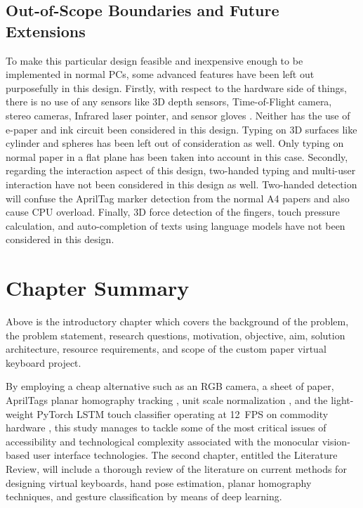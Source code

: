 \subsection{Out-of-Scope Boundaries and Future Extensions}
\label{subsec:out_scope_boundaries}
To make this particular design feasible and inexpensive enough to be implemented in normal PCs, some advanced features have been left out purposefully in this design. Firstly, with respect to the hardware side of things, there is no use of any sensors like 3D depth sensors, Time-of-Flight camera, stereo cameras, Infrared laser pointer, and sensor gloves \cite{Lee2019Virtual, Kudale2016RealTime}. Neither has the use of e-paper and ink circuit been considered in this design. Typing on 3D surfaces like cylinder and spheres has been left out of consideration as well. Only typing on normal paper in a flat plane has been taken into account in this case. Secondly, regarding the interaction aspect of this design, two-handed typing and multi-user interaction have not been considered in this design as well. Two-handed detection will confuse the AprilTag marker detection from the normal A4 papers and also cause CPU overload. Finally, 3D force detection of the fingers, touch pressure calculation, and auto-completion of texts using language models have not been considered in this design.

\section{Chapter Summary}
\label{sec:chapter_summary}
Above is the introductory chapter which covers the background of the problem, the problem statement, research questions, motivation, objective, aim, solution architecture, resource requirements, and scope of the custom paper virtual keyboard project.

By employing a cheap alternative such as an RGB camera, a sheet of paper, AprilTags planar homography tracking \cite{Wang2016AprilTag2, Kallwies2020Determining}, unit scale normalization \cite{Zhang2020MediaPipe}, and the light-weight PyTorch LSTM touch classifier operating at 12~FPS on commodity hardware \cite{Hochreiter1997LSTM, GilMartin2023Hand}, this study manages to tackle some of the most critical issues of accessibility and technological complexity associated with the monocular vision-based user interface technologies. The second chapter, entitled the Literature Review, will include a thorough review of the literature on current methods for designing virtual keyboards, hand pose estimation, planar homography techniques, and gesture classification by means of deep learning.


